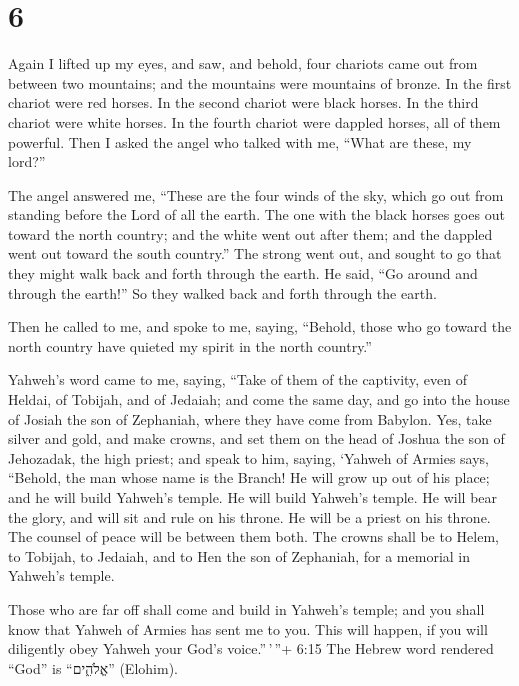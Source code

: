 \hypertarget{section-5}{%
\section{6}\label{section-5}}

 Again I lifted up my eyes, and saw, and behold, four
chariots came out from between two mountains; and the mountains were
mountains of bronze.  In the first chariot were red horses.
In the second chariot were black horses.  In the third
chariot were white horses. In the fourth chariot were dappled horses,
all of them powerful.  Then I asked the angel who talked
with me, ``What are these, my lord?''

 The angel answered me, ``These are the four winds of the
sky, which go out from standing before the Lord of all the earth.
 The one with the black horses goes out toward the north
country; and the white went out after them; and the dappled went out
toward the south country.''  The strong went out, and sought
to go that they might walk back and forth through the earth. He said,
``Go around and through the earth!'' So they walked back and forth
through the earth.

 Then he called to me, and spoke to me, saying, ``Behold,
those who go toward the north country have quieted my spirit in the
north country.''

 Yahweh's word came to me, saying,  ``Take of
them of the captivity, even of Heldai, of Tobijah, and of Jedaiah; and
come the same day, and go into the house of Josiah the son of Zephaniah,
where they have come from Babylon.  Yes, take silver and
gold, and make crowns, and set them on the head of Joshua the son of
Jehozadak, the high priest;  and speak to him, saying,
`Yahweh of Armies says, ``Behold, the man whose name is the Branch! He
will grow up out of his place; and he will build Yahweh's temple.
 He will build Yahweh's temple. He will bear the glory, and
will sit and rule on his throne. He will be a priest on his throne. The
counsel of peace will be between them both.  The crowns
shall be to Helem, to Tobijah, to Jedaiah, and to Hen the son of
Zephaniah, for a memorial in Yahweh's temple.

 Those who are far off shall come and build in Yahweh's
temple; and you shall know that Yahweh of Armies has sent me to you.
This will happen, if you will diligently obey Yahweh your God's
voice.''\,'\,''+ 6:15 The Hebrew word rendered ``God'' is ``אֱלֹהִ֑ים''
(Elohim).

